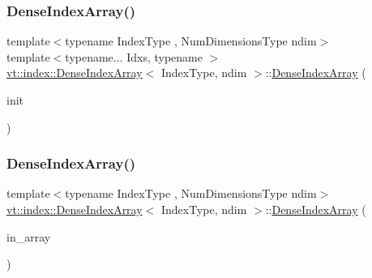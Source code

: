 \mbox{\label{structvt_1_1index_1_1_dense_index_array_aa866f038df37f085bc6a48a57bcdaaa3}} 
\subsubsection{\texorpdfstring{Dense\+Index\+Array()}{DenseIndexArray()}\hspace{0.1cm}{\footnotesize\ttfamily [4/6]}}
{\footnotesize\ttfamily template$<$typename Index\+Type , Num\+Dimensions\+Type ndim$>$ \\
template$<$typename... Idxs, typename $>$ \\
\hyperlink{structvt_1_1index_1_1_dense_index_array}{vt\+::index\+::\+Dense\+Index\+Array}$<$ Index\+Type, ndim $>$\+::\hyperlink{structvt_1_1index_1_1_dense_index_array}{Dense\+Index\+Array} (\begin{DoxyParamCaption}\item[{Idxs \&\&...}]{init }\end{DoxyParamCaption})\hspace{0.3cm}{\ttfamily [explicit]}}

\mbox{\label{structvt_1_1index_1_1_dense_index_array_a2d67c042ae2ac46fb32063ac63c994e8}} 
\subsubsection{\texorpdfstring{Dense\+Index\+Array()}{DenseIndexArray()}\hspace{0.1cm}{\footnotesize\ttfamily [5/6]}}
{\footnotesize\ttfamily template$<$typename Index\+Type , Num\+Dimensions\+Type ndim$>$ \\
\hyperlink{structvt_1_1index_1_1_dense_index_array}{vt\+::index\+::\+Dense\+Index\+Array}$<$ Index\+Type, ndim $>$\+::\hyperlink{structvt_1_1index_1_1_dense_index_array}{Dense\+Index\+Array} (\begin{DoxyParamCaption}\item[{std\+::array$<$ Index\+Type, ndim $>$}]{in\+\_\+array }\end{DoxyParamCaption})}

